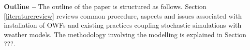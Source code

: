 \textbf{Outline --}
The outline of the paper is structured as follows. Section \ref{literaturereview} reviews common procedure, aspects and issues associated with installation of OWFs and existing practices coupling stochastic simulations with weather models. The methodology involving the modelling is explained in Section ???.